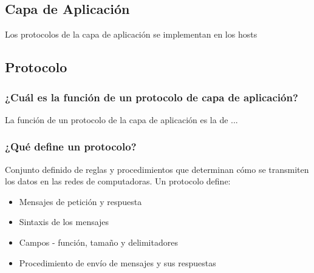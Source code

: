 
\subsection{Capa de Aplicación}\label{sec:capaaplicacion}

Los protocolos de la capa de aplicación se implementan en los hosts


\subsection{Protocolo\label{sec:protocolo}}


\subsubsection{ ¿Cuál es la función de un protocolo de capa de aplicación?}

La función de un protocolo de la capa de aplicación es la de ...

\subsubsection{¿Qué define un protocolo?} 
Conjunto definido de reglas y procedimientos que determinan cómo se transmiten los datos en las redes de computadoras. Un protocolo define:

\begin{itemize}
    \item Mensajes de petición y respuesta
    \item Sintaxis de los mensajes
    \item Campos - función, tamaño y delimitadores
    \item Procedimiento de envío de mensajes y sus respuestas
\end{itemize}